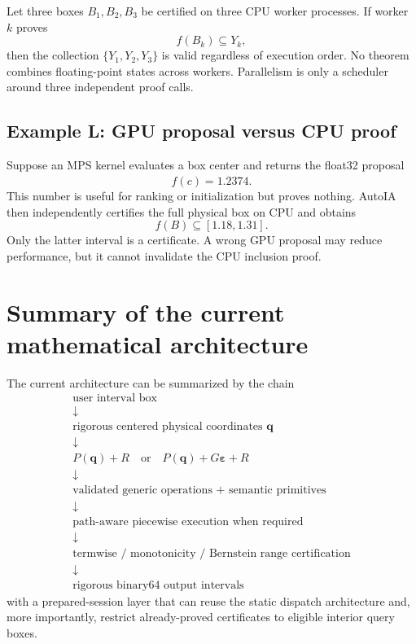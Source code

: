 \documentclass[11pt]{article}
\newcommand{\epsv}{\boldsymbol{\varepsilon}}
\newcommand{\qv}{\mathbf{q}}
\begin{document}
Let three boxes \(B_1,B_2,B_3\) be certified on three CPU worker processes.  If
worker \(k\) proves
\[
  f(B_k)\subseteq Y_k,
\]
then the collection \(\{Y_1,Y_2,Y_3\}\) is valid regardless of execution order.
No theorem combines floating-point states across workers.  Parallelism is only a
scheduler around three independent proof calls.

\subsection{Example L: GPU proposal versus CPU proof}

Suppose an MPS kernel evaluates a box center and returns the float32 proposal
\[
  \widehat f(c)=1.2374.
\]
This number is useful for ranking or initialization but proves nothing.  AutoIA
then independently certifies the full physical box on CPU and obtains
\[
  f(B)\subseteq[1.18,1.31].
\]
Only the latter interval is a certificate.  A wrong GPU proposal may reduce
performance, but it cannot invalidate the CPU inclusion proof.

\section{Summary of the current mathematical architecture}

The current architecture can be summarized by the chain
\[
\boxed{
\begin{array}{c}
\text{user interval box}\\
\downarrow\\
\text{rigorous centered physical coordinates }\qv\\
\downarrow\\
P(\qv)+R\quad\text{or}\quad P(\qv)+G\epsv+R\\
\downarrow\\
\text{validated generic operations + semantic primitives}\\
\downarrow\\
\text{path-aware piecewise execution when required}\\
\downarrow\\
\text{termwise / monotonicity / Bernstein range certification}\\
\downarrow\\
\text{rigorous binary64 output intervals}
\end{array}}
\]
with a prepared-session layer that can reuse the static dispatch architecture and,
more importantly, restrict already-proved certificates to eligible interior
query boxes.
\end{document}
